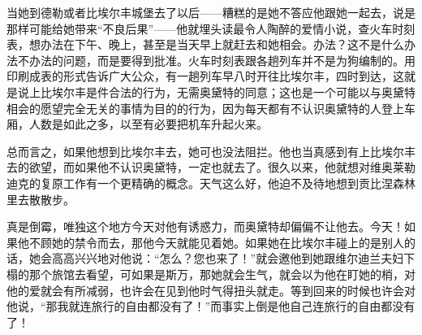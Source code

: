 \par 当她到德勒或者比埃尔丰城堡去了以后——糟糕的是她不答应他跟她一起去，说是那样可能给她带来“不良后果”——他就埋头读最令人陶醉的爱情小说，查火车时刻表，想办法在下午、晚上，甚至是当天早上就赶去和她相会。办法？这不是什么办法不办法的问题，而是要得到批准。火车时刻表跟各趟列车并不是为狗编制的。用印刷成表的形式告诉广大公众，有一趟列车早八时开往比埃尔丰，四时到达，这就是说上比埃尔丰是件合法的行为，无需奥黛特的同意；这也是一个可能以与奥黛特相会的愿望完全无关的事情为目的的行为，因为每天都有不认识奥黛特的人登上车厢，人数是如此之多，以至有必要把机车升起火来。
\par 总而言之，如果他想到比埃尔丰去，她可也没法阻拦。他也当真感到有上比埃尔丰去的欲望，而如果他不认识奥黛特，一定也就去了。很久以来，他就想对维奥莱勒迪克的复原工作有一个更精确的概念。天气这么好，他迫不及待地想到贡比涅森林里去散散步。
\par 真是倒霉，唯独这个地方今天对他有诱惑力，而奥黛特却偏偏不让他去。今天！如果他不顾她的禁令而去，那他今天就能见着她。如果她在比埃尔丰碰上的是别人的话，她会高高兴兴地对他说：“怎么？您也来了！”就会邀他到她跟维尔迪兰夫妇下榻的那个旅馆去看望，可如果是斯万，那她就会生气，就会以为他在盯她的梢，对他的爱就会有所减弱，也许会在见到他时气得扭头就走。等到回来的时候也许会对他说，“那我就连旅行的自由都没有了！”而事实上倒是他自己连旅行的自由都没有了！
